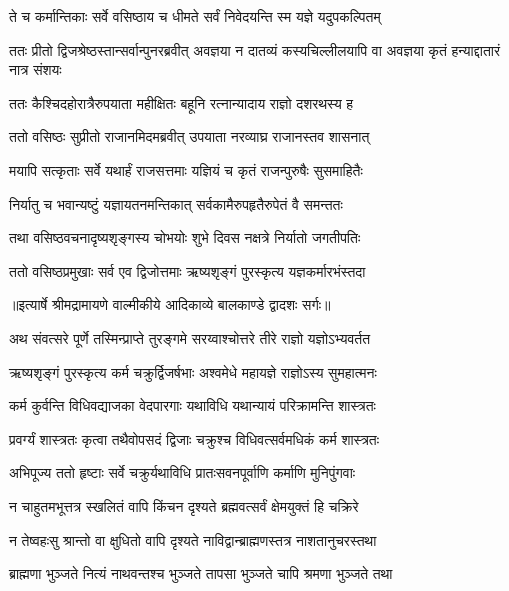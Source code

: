 \twolineshloka
{ते च कर्मान्तिकाः सर्वे वसिष्ठाय च धीमते}
{सर्वं निवेदयन्ति स्म यज्ञे यदुपकल्पितम्} %

\threelineshloka
{ततः प्रीतो द्विजश्रेष्ठस्तान्सर्वान्पुनरब्रवीत्}
{अवज्ञया न दातव्यं कस्यचिल्लीलयापि वा}
{अवज्ञया कृतं हन्याद्दातारं नात्र संशयः} %

\twolineshloka
{ततः कैश्चिदहोरात्रैरुपयाता महीक्षितः}
{बहूनि रत्नान्यादाय राज्ञो दशरथस्य ह} %

\twolineshloka
{ततो वसिष्ठः सुप्रीतो राजानमिदमब्रवीत्}
{उपयाता नरव्याघ्र राजानस्तव शासनात्} %

\twolineshloka
{मयापि सत्कृताः सर्वे यथार्हं राजसत्तमाः}
{यज्ञियं च कृतं राजन्पुरुषैः सुसमाहितैः} %

\twolineshloka
{निर्यातु च भवान्यष्टुं यज्ञायतनमन्तिकात्}
{सर्वकामैरुपहृतैरुपेतं वै समन्ततः} %

\twolineshloka
{तथा वसिष्ठवचनादृष्यशृङ्गस्य चोभयोः}
{शुभे दिवस नक्षत्रे निर्यातो जगतीपतिः} %

\twolineshloka
{ततो वसिष्ठप्रमुखाः सर्व एव द्विजोत्तमाः}
{ऋष्यशृङ्गं पुरस्कृत्य यज्ञकर्मारभंस्तदा} %


{॥इत्यार्षे श्रीमद्रामायणे वाल्मीकीये आदिकाव्ये बालकाण्डे द्वादशः सर्गः॥}


\twolineshloka
{अथ संवत्सरे पूर्णे तस्मिन्प्राप्ते तुरङ्गमे}
{सरय्वाश्चोत्तरे तीरे राज्ञो यज्ञोऽभ्यवर्तत} %

\twolineshloka
{ऋष्यशृङ्गं पुरस्कृत्य कर्म चक्रुर्द्विजर्षभाः}
{अश्वमेधे महायज्ञे राज्ञोऽस्य सुमहात्मनः} %

\twolineshloka
{कर्म कुर्वन्ति विधिवद्याजका वेदपारगाः}
{यथाविधि यथान्यायं परिक्रामन्ति शास्त्रतः} %

\twolineshloka
{प्रवर्ग्यं शास्त्रतः कृत्वा तथैवोपसदं द्विजाः}
{चक्रुश्च विधिवत्सर्वमधिकं कर्म शास्त्रतः} %

\twolineshloka
{अभिपूज्य ततो हृष्टाः सर्वे चक्रुर्यथाविधि}
{प्रातःसवनपूर्वाणि कर्माणि मुनिपुंगवाः} %

\twolineshloka
{न चाहुतमभूत्तत्र स्खलितं वापि किंचन}
{दृश्यते ब्रह्मवत्सर्वं क्षेमयुक्तं हि चक्रिरे} %

\twolineshloka
{न तेष्वहःसु श्रान्तो वा क्षुधितो वापि दृश्यते}
{नाविद्वान्ब्राह्मणस्तत्र नाशतानुचरस्तथा} %

\twolineshloka
{ब्राह्मणा भुञ्जते नित्यं नाथवन्तश्च भुञ्जते}
{तापसा भुञ्जते चापि श्रमणा भुञ्जते तथा} %

